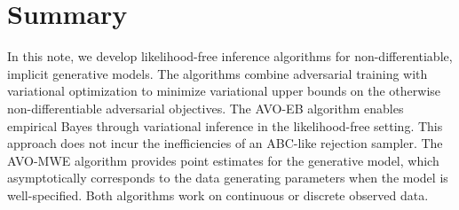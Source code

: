 \documentclass[twocolumn,superscriptaddress,aps]{revtex4-1}
\newcommand{\bftheta}{{\bm \theta}}
\newcommand{\bfpsi}{{\bm \psi}}
\newcommand{\bfphi}{{\bm \phi}}
\newcommand{\bfx}{\mathbf{x}}
\theoremstyle{plain}
\begin{document}
%
%
%
%
%





\section{Summary}

In this note, we develop likelihood-free inference algorithms for
non-differentiable, implicit generative models. The algorithms combine
adversarial training  with variational optimization to minimize variational
upper bounds  on the otherwise non-differentiable adversarial objectives. The
AVO-EB algorithm enables empirical Bayes through variational inference in the
likelihood-free setting. This approach does not incur the inefficiencies of an
ABC-like rejection sampler. The AVO-MWE algorithm provides point estimates for
the generative model, which asymptotically corresponds to the data generating
parameters when the model is well-specified. Both algorithms work on continuous
or discrete observed data.
\end{document}
